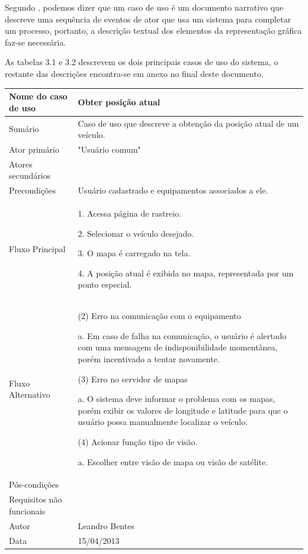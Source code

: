 Segundo \textcite{jacobson:2005}, podemos dizer que um caso de uso é um documento narrativo que descreve uma sequência de eventos de ator que usa um sistema para completar um processo, portanto, a descrição textual dos elementos da representação gráfica faz-se necessária.

As tabelas 3.1 e 3.2 descrevem os dois principais casos de uso do sistema, o restante das descrições encontra-se  em anexo no final deste documento.
\newpage
\begin{flushleft}
\tablefirsthead{}
\tablehead{}
\tabletail{}
\tablelasttail{}
\begin{supertabular}{|m{5.5680003cm}|m{9.325cm}|}
\hline
Nome do caso de uso &
Obter posição atual\\\hline
Sumário &
Caso de uso que descreve a obtenção da posição atual de um veículo. \\\hline
Ator primário &
"Usuário comum"\\\hline
Atores secundários &
~
\\\hline
Precondições &
Usuário cadastrado e equipamentos associados a ele. \\\hline
Fluxo Principal &
1. Acessa página de rastreio.

2. Selecionar o veículo desejado.

3. O mapa é carregado na tela.

4. A posição atual é exibida no mapa, representada por um ponto especial.\\\hline
Fluxo Alternativo &
(2) Erro na comunicação com o equipamento

a. Em caso de falha na comunicação, o usuário é alertado com uma mensagem de indisponibilidade momentânea, porém incentivado a tentar novamente.

(3) Erro no servidor de mapas

a. O sistema deve informar o problema com os mapas, porém exibir os valores de longitude e latitude para que o usuário possa manualmente localizar o veículo.

(4) Acionar função tipo de visão.

a. Escolher entre visão de mapa ou visão de satélite.\\\hline
Pós-condições &
~
\\\hline
Requisitos não funcionais &
~\\\hline
Autor &
Leandro Bentes\\\hline
Data &
15/04/2013\\\hline
\end{supertabular}
\end{flushleft}

